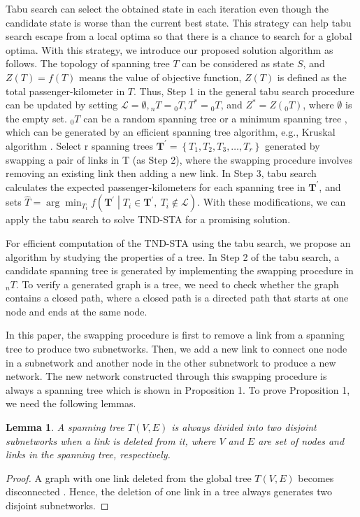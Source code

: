 \documentclass[10pt,english]{article}
\newtheorem{lemma}[theorem]{Lemma}
\begin{document}
Tabu search can select the obtained state in each iteration even though the candidate state is worse than the current best state. This strategy can help tabu search escape from a local optima so that there is a chance to search for a global optima. With this strategy, we introduce our proposed solution algorithm as follows. The topology of spanning tree $T$ can be considered as state $S$, and $Z(T)=f\left(T\right)$ means the value of objective function, $Z\left(T\right)$ is defined as the total passenger-kilometer in $T$. Thus, Step 1 in the general tabu search procedure can be updated by setting $\mathcal{L}=\emptyset, {_n}T={_0}T, T^\ast={_0}T$, and $Z^\ast=Z\left({_0}T\right)$, where $\emptyset$ is the empty set. ${_0}T$ can be a random spanning tree or a minimum spanning tree \citep{Oncan2008, Rothlauf2009}, which can be generated by an efficient spanning tree algorithm, e.g., Kruskal algorithm \citep{Kruskal1956}. Select r spanning trees $\boldsymbol{T}^\prime=\left\{T_1,T_2,T_3,\ldots,T_r\right\}$ generated by swapping a pair of links in T (as Step 2), where the swapping procedure involves removing an existing link then adding a new link. In Step 3, tabu search calculates the expected passenger-kilometers for each spanning tree in $\boldsymbol{T}^\prime$, and sets $\hat{T}=\arg{\min_{T_i}{f\left(\boldsymbol{T}^\prime\middle| T_i\in\boldsymbol{T}^\prime,\ T_i\notin\mathcal{L}\right)}}$. With these modifications, we can apply the tabu search to solve TND-STA for a promising solution.

For efficient computation of the TND-STA using the tabu search, we propose an algorithm by studying the properties of a tree. In Step 2 of the tabu search, a candidate spanning tree is generated by implementing the swapping procedure in ${_n}T$. To verify a generated graph is a tree, we need to check whether the graph contains a closed path, where a closed path is a directed path that starts at one node and ends at the same node.

In this paper, the swapping procedure is first to remove a link from a spanning tree to produce two subnetworks. Then, we add a new link to connect one node in a subnetwork and another node in the other subnetwork to produce a new network. The new network constructed through this swapping procedure is always a spanning tree which is shown in Proposition 1. To prove Proposition 1, we need the following lemmas.

\begin{lemma}
  A spanning tree $T\left(V,E\right)$ is always divided into two disjoint subnetworks when a link is deleted from it, where $V$ and $E$ are set of nodes and links in the spanning tree, respectively.
  \label{lem:tree_divided_two_subnetworks}
\end{lemma}
\begin{proof}
  A graph with one link deleted from the global tree $T\left(V,E\right)$ becomes disconnected \citep{Diestel2010}. Hence, the deletion of one link in a tree always generates two disjoint subnetworks.
\end{proof}
\end{document}
